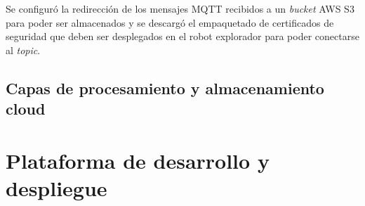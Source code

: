 Se configuró la redirección de los mensajes MQTT recibidos a un \textit{bucket} AWS S3 para poder ser almacenados y se descargó el empaquetado de certificados de seguridad que deben ser desplegados en el robot explorador para poder conectarse al \textit{topic}.

\subsection{Capas de procesamiento y almacenamiento cloud}



\section{Plataforma de desarrollo y despliegue}




